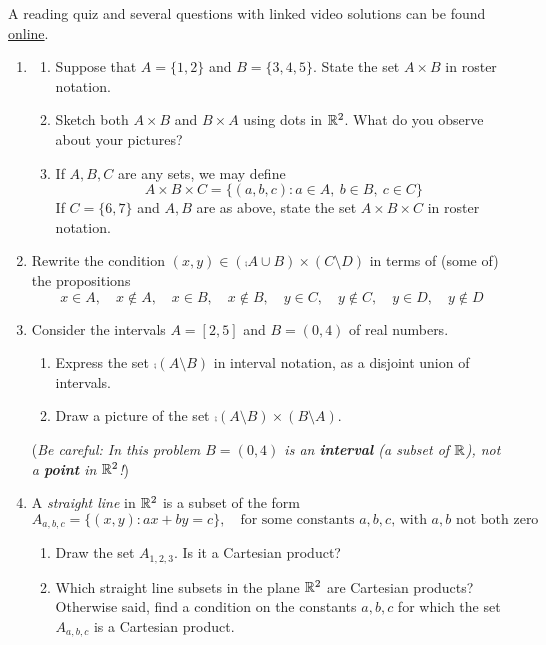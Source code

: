 \begin{exercises}{}{}
	A reading quiz and several questions with linked video solutions can be found \href{http://www.math.uci.edu/~ndonalds/math13/selftest/6-1-cartprod.html}{online}.

	\begin{enumerate}
	  \item\begin{enumerate}
	    \item Suppose that $A=\{1,2\}$ and $B=\{3,4,5\}$. State the set $A\times B$ in roster notation.
	    \item Sketch both $A\times B$ and $B\times A$ using dots in $\mathbb{R}^2$. What do you observe about your pictures?
	    \item If $A,B,C$ are any sets, we may define
	    \[
	    	A\times B\times C=\bigl\{(a,b,c):a\in A,\ b\in B,\ c\in C\bigr\}
	    \]
	    If $C=\{6,7\}$ and $A,B$ are as above, state the set $A\times B\times C$ in roster notation.
	  \end{enumerate}
	
	
		\item Rewrite the condition $(x,y)\in (\comp{A}\cup B)\times (C\setminus D)$ in terms of (some of) the propositions
		\[
			x\in A,\quad x\not\in A,\quad x\in B,\quad x\not\in B,\quad y\in C,\quad y\not\in C,\quad y\in D,\quad y\not\in D
		\]
	  
	  
	  \item Consider the intervals $A=[2,5]$ and $B=(0,4)$ of real numbers.
	  \begin{enumerate}
	    \item Express the set $\comp{(A\setminus B)}$ in interval notation, as a disjoint union of intervals.
	    \item Draw a picture of the set $\comp{(A\setminus B)}\times (B\setminus A)$.
	  \end{enumerate}
	  (\emph{Be careful: In this problem $B=(0,4)$ is an \textbf{interval} (a subset of $\mathbb{R}$), not a \textbf{point} in $\mathbb{R}^2$!})
	
		
		\item A \emph{straight line} in $\mathbb{R}^2$ is a subset of the form
		\[
			A_{a,b,c}=\bigl\{(x,y):ax+by=c\bigr\},\quad\text{for some constants $a,b,c$, with $a,b$ not both zero}
		\]
		\begin{enumerate}
		  \item Draw the set $A_{1,2,3}$. Is it a Cartesian product?
		 	\item Which straight line subsets in the plane $\mathbb{R}^2$ are Cartesian products? Otherwise said, find a condition on the constants $a,b,c$ for which the set $A_{a,b,c}$ is a Cartesian product.
		\end{enumerate}
		

\end{enumerate}
\end{exercises}
